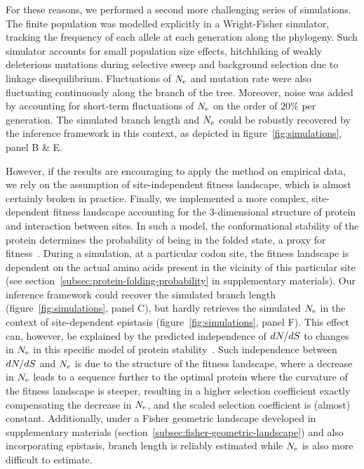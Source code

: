 For these reasons, we performed a second more challenging series of simulations.
The finite population was modelled explicitly in a Wright-Fisher simulator, tracking the frequency of each allele at each generation along the phylogeny.
Such simulator accounts for small population size effects, hitchhiking of weakly deleterious mutations during selective sweep and background selection due to linkage disequilibrium.
Fluctuations of $N_{\mathrm{e}}$ and mutation rate were also fluctuating continuously along the branch of the tree.
Moreover, noise was added by accounting for short-term fluctuations of $N_{\mathrm{e}}$ on the order of $20\%$ per generation.
The simulated branch length and $N_{\mathrm{e}}$ could be robustly recovered by the inference framework in this context, as depicted in figure~\ref{fig:simulations}, panel B \& E.

However, if the results are encouraging to apply the method on empirical data, we rely on the assumption of site-independent fitness landscape, which is almost certainly broken in practice.
Finally, we implemented a more complex, site-dependent fitness landscape accounting for the $3$-dimensional structure of protein and interaction between sites.
In such a model, the conformational stability of the protein determines the probability of being in the folded state, a proxy for fitness~\citep{Williams2006, Goldstein2011, Pollock2012}.
During a simulation, at a particular codon site, the fitness landscape is dependent on the actual amino acids present in the vicinity of this particular site (see section~\ref{subsec:protein-folding-probability} in supplementary materials).
Our inference framework could recover the simulated branch length (figure~\ref{fig:simulations}, panel C), but hardly retrieves the simulated $N_{\mathrm{e}}$ in the context of site-dependent epistasis (figure~\ref{fig:simulations}, panel F).
This effect can, however, be explained by the predicted independence of $dN/dS$ to changes in $N_{\mathrm{e}}$ in this specific model of protein stability~\citep{Goldstein2013}.
Such independence between $dN/dS$ and $N_{\mathrm{e}}$ is due to the structure of the fitness landscape, where a decrease in $N_{\mathrm{e}}$ leads to a sequence further to the optimal protein where the curvature of the fitness landscape is steeper, resulting in a higher selection coefficient exactly compensating the decrease in $N_{\mathrm{e}}$, and the scaled selection coefficient is (almost) constant.
Additionally, under a Fisher geometric landscape developed in supplementary materials (section~\ref{subsec:fisher-geometric-landscape}) and also incorporating epistasis, branch length is reliably estimated while $N_{\mathrm{e}}$ is also more difficult to estimate.

